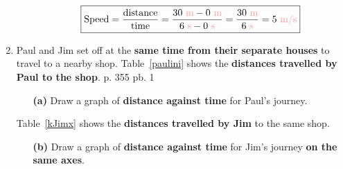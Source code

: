 \documentclass[A4,12pt]{article}
\begin{document}
\begin{enumerate}[label=\bfseries (\arabic*)]
\begin{itemize}
\begin{example}
\begin{equation*}
    \boxed{\text{Speed}=\frac{\text{distance}}{\text{time}}=\frac{\msis{30}-\msis{0}}{\tsis{6}-\tsis{0}}=\frac{\msis{30}}{\tsis{6}}=\vsis{5}}
    \end{equation*}
    \end{example}
\end{itemize}

















\item Paul and Jim set off at the \textbf{same time from their separate houses} to travel to a nearby shop. Table~\ref{paulini} shows the \textbf{distances travelled by Paul to the shop}. \cite{CCEADA,Triguero} p. 355 pb. 1
%
\begin{table}[H]
    \centering
    \caption{}
    \label{paulini}
\end{table}
%
\begin{itemize}
    \item[\bf (a)] Draw a graph of \textbf{distance against time} for Paul's journey.
%
\end{itemize}
Table~\ref{kJimx} shows the \textbf{distances travelled by Jim} to the same shop.
%
\begin{table}[H]
    \centering
    \caption{}
    \label{kJimx}
\end{table}
%
\begin{itemize}
    \item[\bf (b)] Draw a graph of \textbf{distance against time} for Jim's journey \textbf{on the same axes}.

\end{itemize}
\end{enumerate}
\end{document}
